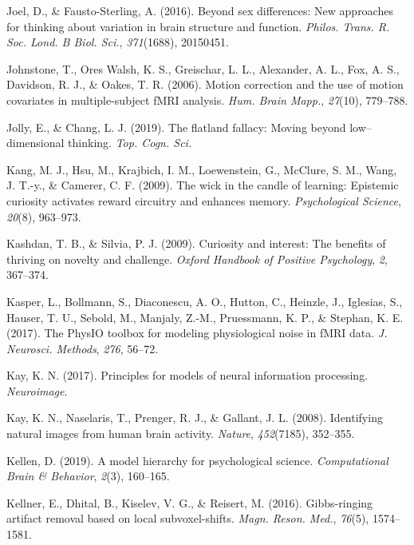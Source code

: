 \documentclass[11pt,american,]{memoir} %
\begin{document}
\leavevmode\hypertarget{ref-Joel2016-uo}{}%
Joel, D., \& Fausto-Sterling, A. (2016). Beyond sex differences: New approaches for thinking about variation in brain structure and function. \emph{Philos. Trans. R. Soc. Lond. B Biol. Sci.}, \emph{371}(1688), 20150451.

\leavevmode\hypertarget{ref-Johnstone2006-tn}{}%
Johnstone, T., Ores Walsh, K. S., Greischar, L. L., Alexander, A. L., Fox, A. S., Davidson, R. J., \& Oakes, T. R. (2006). Motion correction and the use of motion covariates in multiple-subject fMRI analysis. \emph{Hum. Brain Mapp.}, \emph{27}(10), 779--788.

\leavevmode\hypertarget{ref-Jolly2019-lx}{}%
Jolly, E., \& Chang, L. J. (2019). The flatland fallacy: Moving beyond low--dimensional thinking. \emph{Top. Cogn. Sci.}

\leavevmode\hypertarget{ref-kang2009wick}{}%
Kang, M. J., Hsu, M., Krajbich, I. M., Loewenstein, G., McClure, S. M., Wang, J. T.-y., \& Camerer, C. F. (2009). The wick in the candle of learning: Epistemic curiosity activates reward circuitry and enhances memory. \emph{Psychological Science}, \emph{20}(8), 963--973.

\leavevmode\hypertarget{ref-kashdan2009curiosity}{}%
Kashdan, T. B., \& Silvia, P. J. (2009). Curiosity and interest: The benefits of thriving on novelty and challenge. \emph{Oxford Handbook of Positive Psychology}, \emph{2}, 367--374.

\leavevmode\hypertarget{ref-Kasper2017-lp}{}%
Kasper, L., Bollmann, S., Diaconescu, A. O., Hutton, C., Heinzle, J., Iglesias, S., Hauser, T. U., Sebold, M., Manjaly, Z.-M., Pruessmann, K. P., \& Stephan, K. E. (2017). The PhysIO toolbox for modeling physiological noise in fMRI data. \emph{J. Neurosci. Methods}, \emph{276}, 56--72.

\leavevmode\hypertarget{ref-Kay2017-vr}{}%
Kay, K. N. (2017). Principles for models of neural information processing. \emph{Neuroimage}.

\leavevmode\hypertarget{ref-kay2008identifying}{}%
Kay, K. N., Naselaris, T., Prenger, R. J., \& Gallant, J. L. (2008). Identifying natural images from human brain activity. \emph{Nature}, \emph{452}(7185), 352--355.

\leavevmode\hypertarget{ref-Kellen2019-af}{}%
Kellen, D. (2019). A model hierarchy for psychological science. \emph{Computational Brain \& Behavior}, \emph{2}(3), 160--165.

\leavevmode\hypertarget{ref-Kellner2016-xb}{}%
Kellner, E., Dhital, B., Kiselev, V. G., \& Reisert, M. (2016). Gibbs-ringing artifact removal based on local subvoxel-shifts. \emph{Magn. Reson. Med.}, \emph{76}(5), 1574--1581.
\end{document}
